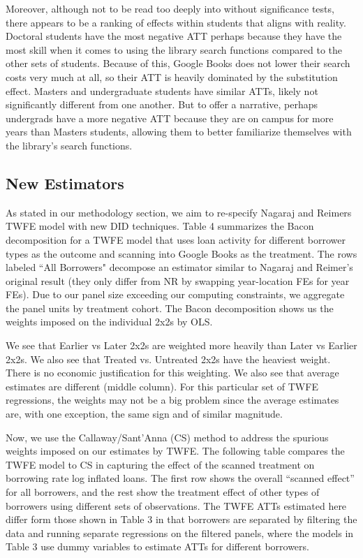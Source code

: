 \documentclass{article}
\begin{document}
Moreover, although not to be read too deeply into without significance tests, there appears to be a ranking of effects within students that aligns with reality. Doctoral students have the most negative ATT perhaps because they have the most skill when it comes to using the library search functions compared to the other sets of students. Because of this, Google Books does not lower their search costs very much at all, so their ATT is heavily dominated by the substitution effect. Masters and undergraduate students have similar ATTs, likely not significantly different from one another. But to offer a narrative, perhaps undergrads have a more negative ATT because they are on campus for more years than Masters students, allowing them to better familiarize themselves with the library's search functions. 

\subsection{New Estimators}

As stated in our methodology section, we aim to re-specify Nagaraj and Reimers TWFE model with new DID techniques. Table 4 summarizes the Bacon decomposition for a TWFE model that uses loan activity for different borrower types as the outcome and scanning into Google Books as the treatment. The rows labeled ``All Borrowers" decompose an estimator similar to Nagaraj and Reimer's original result (they only differ from NR by swapping year-location FEs for year FEs). Due to our panel size exceeding our computing constraints, we aggregate the panel units by treatment cohort. The Bacon decomposition shows us the weights imposed on the individual 2x2s by OLS. 

We see that Earlier vs Later 2x2s are weighted more heavily than Later vs Earlier 2x2s. We also see that Treated vs. Untreated 2x2s have the heaviest weight. There is no economic justification for this weighting. We also see that average estimates are different (middle column).  For this particular set of TWFE regressions, the weights may not be a big problem since the average estimates are, with one exception, the same sign and of similar magnitude. 

Now, we use the Callaway/Sant’Anna (CS) method to address the spurious weights imposed on our estimates by TWFE. The following table compares the TWFE model to CS in capturing the effect of the scanned treatment on borrowing rate log inflated loans. The first row shows the overall “scanned effect” for all borrowers, and the rest show the treatment effect of other types of borrowers using different sets of observations. The TWFE ATTs estimated here differ form those shown in Table 3 in that borrowers are separated by filtering the data and running separate regressions on the filtered panels, where the models in Table 3 use dummy variables to estimate ATTs for different borrowers. 

\end{document}
